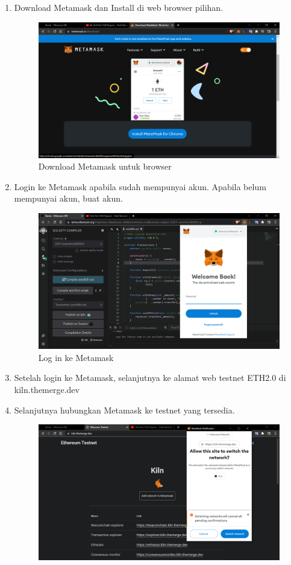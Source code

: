 \begin{enumerate}
\item{Download Metamask dan Install di web browser pilihan.}
	\begin{figure}[htp]
		\centering
		\includegraphics[scale=0.2]{gambar/bab3/metamask/1.png}
		\caption{Download Metamask untuk browser}
		\label{fig:downloadmetamask}
	\end{figure}
\item{Login ke Metamask apabila sudah mempunyai akun. Apabila belum mempunyai akun, buat akun.}
	\begin{figure}[htp]
		\centering
		\includegraphics[scale=0.2]{gambar/bab3/metamask/2.png}
		\caption{Log in ke Metamask}
		\label{fig:login2metamask}
	\end{figure}
\item{Setelah login ke Metamask, selanjutnya ke alamat web testnet ETH2.0 di kiln.themerge.dev}
\newpage
\item{Selanjutnya hubungkan Metamask ke testnet yang tersedia.}
	\begin{figure}[htp]
		\centering
		\includegraphics[scale=0.2]{gambar/bab3/metamask/4.png}

\end{figure}
\end{enumerate}

